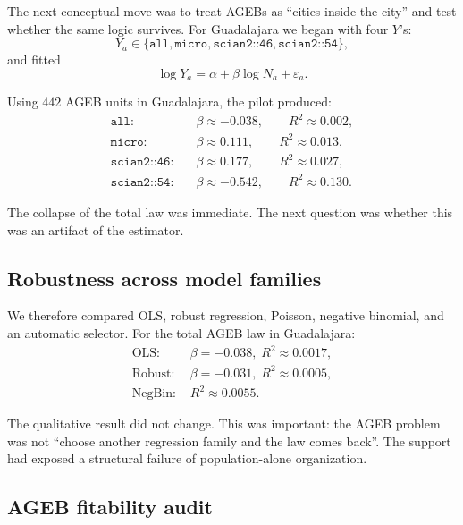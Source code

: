 \documentclass[11pt]{article}
\begin{document}
The next conceptual move was to treat AGEBs as ``cities inside the city'' and test whether the same logic survives. For Guadalajara we began with four \(Y\)'s:
\begin{equation}
Y_a \in \{\texttt{all},\texttt{micro},\texttt{scian2::46},\texttt{scian2::54}\},
\end{equation}
and fitted
\begin{equation}
\log Y_a = \alpha + \beta \log N_a + \varepsilon_a.
\label{eq:ageb-pilot}
\end{equation}

Using \(442\) AGEB units in Guadalajara, the pilot produced:
\begin{align}
\texttt{all}: &\quad \beta \approx -0.038,\qquad R^2 \approx 0.002,\\
\texttt{micro}: &\quad \beta \approx 0.111,\qquad R^2 \approx 0.013,\\
\texttt{scian2::46}: &\quad \beta \approx 0.177,\qquad R^2 \approx 0.027,\\
\texttt{scian2::54}: &\quad \beta \approx -0.542,\qquad R^2 \approx 0.130.
\end{align}

The collapse of the total law was immediate. The next question was whether this was an artifact of the estimator.

\subsection{Robustness across model families}

We therefore compared OLS, robust regression, Poisson, negative binomial, and an automatic selector. For the total AGEB law in Guadalajara:
\begin{align}
\text{OLS: } & \beta=-0.038,\; R^2\approx 0.0017,\\
\text{Robust: } & \beta=-0.031,\; R^2\approx 0.0005,\\
\text{NegBin: } & R^2\approx 0.0055.
\end{align}

The qualitative result did not change. This was important: the AGEB problem was not ``choose another regression family and the law comes back''. The support had exposed a structural failure of population-alone organization.

\subsection{AGEB fitability audit}
\end{document}
